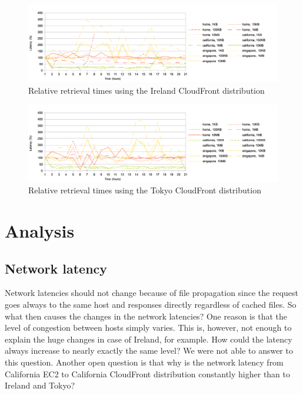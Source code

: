 \documentclass[conference]{IEEEtran}
\begin{document}
\begin{figure}[]
    \centering
    \includegraphics[width=7in]{images/ireland_relative.png}
    \caption[]{Relative retrieval times using the Ireland CloudFront distribution}
    \label{fig:ireland_relative}
\end{figure}

\begin{figure}[]
    \centering
    \includegraphics[width=7in]{images/tokyo_relative.png}
    \caption[]{Relative retrieval times using the Tokyo CloudFront distribution}
    \label{fig:tokyo_relative}
\end{figure}


\section{Analysis}

\subsection{Network latency}
Network latencies should not change because of file propagation since the request goes always to the same host and responses directly regardless of cached files. So what then causes the changes in the network latencies? One reason is that the level of congestion between hosts simply varies. This is, however, not enough to explain the huge changes in case of Ireland, for example. How could the latency always increase to nearly exactly the same level? We were not able to answer to this question. Another open question is that why is the network latency from California EC2 to California CloudFront distribution constantly higher than to Ireland and Tokyo?
\end{document}
